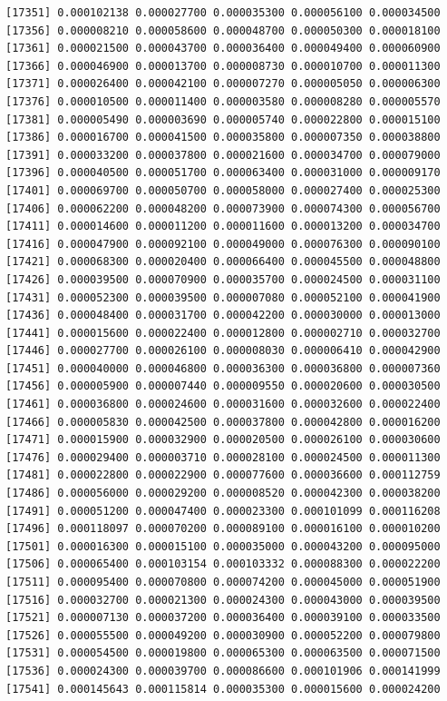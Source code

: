 \documentclass[]{article}
\begin{document}
\begin{verbatim}
[17351] 0.000102138 0.000027700 0.000035300 0.000056100 0.000034500
[17356] 0.000008210 0.000058600 0.000048700 0.000050300 0.000018100
[17361] 0.000021500 0.000043700 0.000036400 0.000049400 0.000060900
[17366] 0.000046900 0.000013700 0.000008730 0.000010700 0.000011300
[17371] 0.000026400 0.000042100 0.000007270 0.000005050 0.000006300
[17376] 0.000010500 0.000011400 0.000003580 0.000008280 0.000005570
[17381] 0.000005490 0.000003690 0.000005740 0.000022800 0.000015100
[17386] 0.000016700 0.000041500 0.000035800 0.000007350 0.000038800
[17391] 0.000033200 0.000037800 0.000021600 0.000034700 0.000079000
[17396] 0.000040500 0.000051700 0.000063400 0.000031000 0.000009170
[17401] 0.000069700 0.000050700 0.000058000 0.000027400 0.000025300
[17406] 0.000062200 0.000048200 0.000073900 0.000074300 0.000056700
[17411] 0.000014600 0.000011200 0.000011600 0.000013200 0.000034700
[17416] 0.000047900 0.000092100 0.000049000 0.000076300 0.000090100
[17421] 0.000068300 0.000020400 0.000066400 0.000045500 0.000048800
[17426] 0.000039500 0.000070900 0.000035700 0.000024500 0.000031100
[17431] 0.000052300 0.000039500 0.000007080 0.000052100 0.000041900
[17436] 0.000048400 0.000031700 0.000042200 0.000030000 0.000013000
[17441] 0.000015600 0.000022400 0.000012800 0.000002710 0.000032700
[17446] 0.000027700 0.000026100 0.000008030 0.000006410 0.000042900
[17451] 0.000040000 0.000046800 0.000036300 0.000036800 0.000007360
[17456] 0.000005900 0.000007440 0.000009550 0.000020600 0.000030500
[17461] 0.000036800 0.000024600 0.000031600 0.000032600 0.000022400
[17466] 0.000005830 0.000042500 0.000037800 0.000042800 0.000016200
[17471] 0.000015900 0.000032900 0.000020500 0.000026100 0.000030600
[17476] 0.000029400 0.000003710 0.000028100 0.000024500 0.000011300
[17481] 0.000022800 0.000022900 0.000077600 0.000036600 0.000112759
[17486] 0.000056000 0.000029200 0.000008520 0.000042300 0.000038200
[17491] 0.000051200 0.000047400 0.000023300 0.000101099 0.000116208
[17496] 0.000118097 0.000070200 0.000089100 0.000016100 0.000010200
[17501] 0.000016300 0.000015100 0.000035000 0.000043200 0.000095000
[17506] 0.000065400 0.000103154 0.000103332 0.000088300 0.000022200
[17511] 0.000095400 0.000070800 0.000074200 0.000045000 0.000051900
[17516] 0.000032700 0.000021300 0.000024300 0.000043000 0.000039500
[17521] 0.000007130 0.000037200 0.000036400 0.000039100 0.000033500
[17526] 0.000055500 0.000049200 0.000030900 0.000052200 0.000079800
[17531] 0.000054500 0.000019800 0.000065300 0.000063500 0.000071500
[17536] 0.000024300 0.000039700 0.000086600 0.000101906 0.000141999
[17541] 0.000145643 0.000115814 0.000035300 0.000015600 0.000024200

\end{verbatim}
\end{document}
